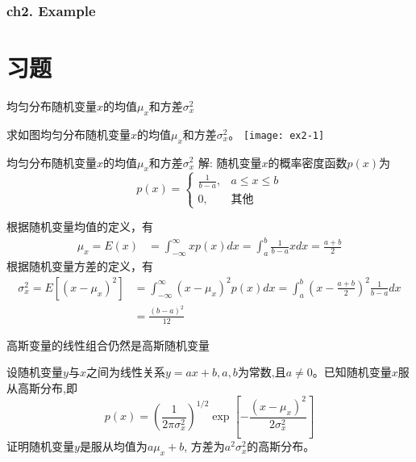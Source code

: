 \begin{frame}[shrink]
\frametitle{ch2. Example}
\tableofcontents%
\end{frame}

\section{习题}

\begin{frame}{均匀分布随机变量$x$的均值$\mu_x$和方差$\sigma_x^2$}
\begin{example}
求如图均匀分布随机变量$x$的均值$\mu_x$和方差$\sigma_x^2$。
\texttt{[image: ex2-1]}
\end{example}
\end{frame}

\begin{frame}{均匀分布随机变量$x$的均值$\mu_x$和方差$\sigma_x^2$}
解: 随机变量$x$的概率密度函数$p(x)$为
\[p(x)=\begin{cases}
\frac{1}{b-a}, &a\le x\le b\\
0, &\text{其他}
\end{cases} \]

	根据随机变量均值的定义，有
	\begin{align*}
	\mu_x=E(x)&=\int_{-\infty}^{\infty}xp(x)dx=\int_{a}^{b}\frac{1}{b-a}xdx =\frac{a+b}{2}
	\end{align*}
	根据随机变量方差的定义，有
	\begin{align*}
	\sigma_x^2=E[(x-\mu_x)^2]&=\int_{-\infty}^{\infty}(x-\mu_x)^2p(x)dx=\int_{a}^{b}\left(x-\frac{a+b}{2}\right)^2\frac{1}{b-a}dx \\
	&=\frac{(b-a)^2}{12}
	\end{align*}	
\end{frame}

\begin{frame}{高斯变量的线性组合仍然是高斯随机变量}
\begin{example}
	设随机变量$y$与$x$之间为线性关系$y=ax+b,a,b$为常数,且$a\ne 0$。已知随机变量$x$服从高斯分布,即
	\[p(x)=\left(\frac{1}{2\pi\sigma_x^2}\right)^{1/2}\exp\left[-\frac{(x-\mu_x)^2}{2\sigma_x^2}\right] \]
	证明随机变量$y$是服从均值为$a\mu_x+b$, 方差为$a^2\sigma_x^2$的高斯分布。
\end{example}
\end{frame}

